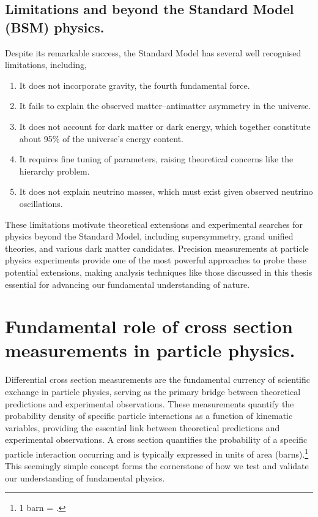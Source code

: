 \subsection{Limitations and beyond the Standard Model (BSM) physics.}
Despite its remarkable success, the Standard Model has several well recognised limitations, including,

    \begin{enumerate}
        \item It does not incorporate gravity, the fourth fundamental force.
        \item It fails to explain the observed matter--antimatter asymmetry in the universe.
        \item It does not account for dark matter or dark energy, which together constitute about 95\% of the universe's energy content.
        \item  It requires fine tuning of parameters, raising theoretical concerns like the hierarchy problem.
        \item  It does not explain neutrino masses, which must exist given observed neutrino oscillations.
    \end{enumerate}
These limitations motivate theoretical extensions and experimental searches for physics beyond the Standard Model, including supersymmetry, grand unified theories, and various dark matter candidates.
%
Precision measurements at particle physics experiments provide one of the most powerful approaches to probe these potential extensions, making analysis techniques like those discussed in this thesis essential for advancing our fundamental understanding of nature.

\section{Fundamental role of cross section measurements in particle physics.}
Differential cross section measurements are the fundamental currency of scientific exchange in particle physics, serving as the primary bridge between theoretical predictions and experimental observations.
%
These measurements quantify the probability density of specific particle interactions as a function of kinematic variables, providing the essential link between theoretical predictions and experimental observations.
%
 A cross section quantifies the probability of a specific particle interaction occurring and is typically expressed in units of area (barns).\footnote{1 barn = .} This seemingly simple concept forms the cornerstone of how we test and validate our understanding of fundamental physics.
 
